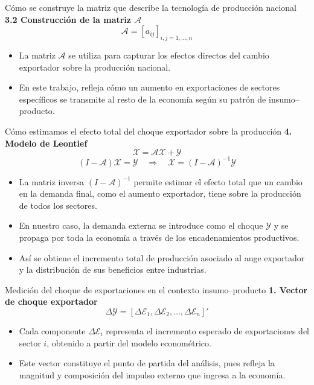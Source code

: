 \documentclass[aspectratio=169,xcolor=dvipsnames]{beamer}
\begin{document}
\begin{frame}{Cómo se construye la matriz que describe la tecnología de producción nacional}
  \textbf{3.2 Construcción de la matriz $\mathcal{A}$}
  \[
    \mathcal{A} = [a_{ij}]_{i,j=1,\dots,n}
  \]
  \begin{itemize}
    \item La matriz $\mathcal{A}$ se utiliza para capturar los efectos directos del cambio exportador sobre la producción nacional.
    \item En este trabajo, refleja cómo un aumento en exportaciones de sectores específicos se transmite al resto de la economía según su patrón de insumo–producto.
  \end{itemize}
\end{frame}

\begin{frame}{Cómo estimamos el efecto total del choque exportador sobre la producción}
  \textbf{4. Modelo de Leontief}
  \[
    \mathcal{X} = \mathcal{A}\mathcal{X} + \mathcal{Y}
  \]
  \[
    (I - \mathcal{A})\mathcal{X} = \mathcal{Y} \quad \Rightarrow \quad \mathcal{X} = (I - \mathcal{A})^{-1}\mathcal{Y}
  \]
  \begin{itemize}
    \item La matriz inversa $(I - \mathcal{A})^{-1}$ permite estimar el efecto total que un cambio en la demanda final, como el aumento exportador, tiene sobre la producción de todos los sectores.
    \item En nuestro caso, la demanda externa se introduce como el choque $\mathcal{Y}$ y se propaga por toda la economía a través de los encadenamientos productivos.
    \item Así se obtiene el incremento total de producción asociado al auge exportador y la distribución de sus beneficios entre industrias.
  \end{itemize}
\end{frame}

\begin{frame}{Medición del choque de exportaciones en el contexto insumo–producto}
    \textbf{1. Vector de choque exportador}
    \[
        \Delta \mathcal{Y} = [\Delta \mathcal{E}_1, \Delta \mathcal{E}_2, \dots, \Delta \mathcal{E}_n]'
    \]
    \begin{itemize}
        \item Cada componente $\Delta \mathcal{E}_i$ representa el incremento esperado de exportaciones del sector $i$, obtenido a partir del modelo econométrico.
        \item Este vector constituye el punto de partida del análisis, pues refleja la magnitud y composición del impulso externo que ingresa a la economía.
    \end{itemize}
\end{frame}
\end{document}
